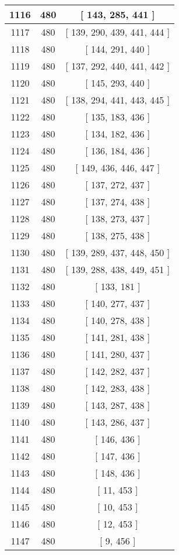 \begin{center}
\begin{longtable}[H]{|| c c c ||}
\hline
1116 & 480 & [ 143, 285, 441 ] \\ 
\hline
1117 & 480 & [ 139, 290, 439, 441, 444 ] \\ 
\hline
1118 & 480 & [ 144, 291, 440 ] \\ 
\hline
1119 & 480 & [ 137, 292, 440, 441, 442 ] \\ 
\hline
1120 & 480 & [ 145, 293, 440 ] \\ 
\hline
1121 & 480 & [ 138, 294, 441, 443, 445 ] \\ 
\hline
1122 & 480 & [ 135, 183, 436 ] \\ 
\hline
1123 & 480 & [ 134, 182, 436 ] \\ 
\hline
1124 & 480 & [ 136, 184, 436 ] \\ 
\hline
1125 & 480 & [ 149, 436, 446, 447 ] \\ 
\hline
1126 & 480 & [ 137, 272, 437 ] \\ 
\hline
1127 & 480 & [ 137, 274, 438 ] \\ 
\hline
1128 & 480 & [ 138, 273, 437 ] \\ 
\hline
1129 & 480 & [ 138, 275, 438 ] \\ 
\hline
1130 & 480 & [ 139, 289, 437, 448, 450 ] \\ 
\hline
1131 & 480 & [ 139, 288, 438, 449, 451 ] \\ 
\hline
1132 & 480 & [ 133, 181 ] \\ 
\hline
1133 & 480 & [ 140, 277, 437 ] \\ 
\hline
1134 & 480 & [ 140, 278, 438 ] \\ 
\hline
1135 & 480 & [ 141, 281, 438 ] \\ 
\hline
1136 & 480 & [ 141, 280, 437 ] \\ 
\hline
1137 & 480 & [ 142, 282, 437 ] \\ 
\hline
1138 & 480 & [ 142, 283, 438 ] \\ 
\hline
1139 & 480 & [ 143, 287, 438 ] \\ 
\hline
1140 & 480 & [ 143, 286, 437 ] \\ 
\hline
1141 & 480 & [ 146, 436 ] \\ 
\hline
1142 & 480 & [ 147, 436 ] \\ 
\hline
1143 & 480 & [ 148, 436 ] \\ 
\hline
1144 & 480 & [ 11, 453 ] \\ 
\hline
1145 & 480 & [ 10, 453 ] \\ 
\hline
1146 & 480 & [ 12, 453 ] \\ 
\hline
1147 & 480 & [ 9, 456 ] \\ 

\end{longtable}
\end{center}

